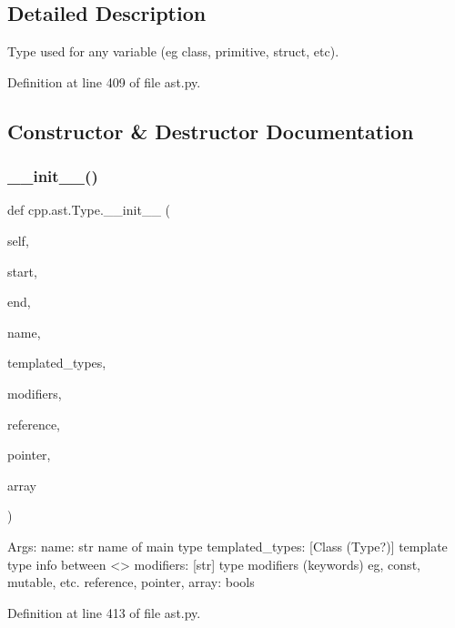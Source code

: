 \subsection{Detailed Description}
\begin{DoxyVerb}Type used for any variable (eg class, primitive, struct, etc).\end{DoxyVerb}
 

Definition at line 409 of file ast.\+py.



\subsection{Constructor \& Destructor Documentation}
\mbox{\label{classcpp_1_1ast_1_1Type_adc20d88db721b5d7b513c08a4d6753c9}} 
\subsubsection{\texorpdfstring{\+\_\+\+\_\+init\+\_\+\+\_\+()}{\_\_init\_\_()}}
{\footnotesize\ttfamily def cpp.\+ast.\+Type.\+\_\+\+\_\+init\+\_\+\+\_\+ (\begin{DoxyParamCaption}\item[{}]{self,  }\item[{}]{start,  }\item[{}]{end,  }\item[{}]{name,  }\item[{}]{templated\+\_\+types,  }\item[{}]{modifiers,  }\item[{}]{reference,  }\item[{}]{pointer,  }\item[{}]{array }\end{DoxyParamCaption})}

\begin{DoxyVerb}Args:
  name: str name of main type
  templated_types: [Class (Type?)] template type info between <>
  modifiers: [str] type modifiers (keywords) eg, const, mutable, etc.
  reference, pointer, array: bools
\end{DoxyVerb}
 

Definition at line 413 of file ast.\+py.



